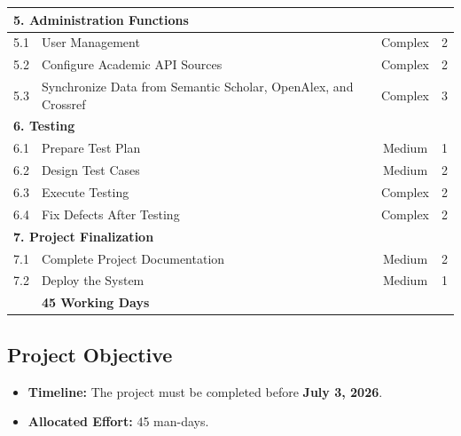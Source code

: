 \documentclass[12pt,a4paper]{article}
\begin{document}
\begin{longtable}{|c|p{9cm}|c|c|}
		\multicolumn{4}{|l|}{\textbf{5. Administration Functions}}\\
		\hline
		5.1 & User Management & \cellcolor{Complex} Complex & 2\\
		\hline
		5.2 & Configure Academic API Sources & \cellcolor{Complex} Complex & 2\\
		\hline
		5.3 & Synchronize Data from Semantic Scholar, OpenAlex, and Crossref & \cellcolor{Complex} Complex & 3\\
		\hline
		
		\multicolumn{4}{|l|}{\textbf{6. Testing}}\\
		\hline
		6.1 & Prepare Test Plan & \cellcolor{Medium} Medium & 1\\
		\hline
		6.2 & Design Test Cases & \cellcolor{Medium} Medium & 2\\
		\hline
		6.3 & Execute Testing & \cellcolor{Complex} Complex & 2\\
		\hline
		6.4 & Fix Defects After Testing & \cellcolor{Complex} Complex & 2\\
		\hline
		
		\multicolumn{4}{|l|}{\textbf{7. Project Finalization}}\\
		\hline
		7.1 & Complete Project Documentation & \cellcolor{Medium} Medium & 2\\
		\hline
		7.2 & Deploy the System & \cellcolor{Medium} Medium & 1\\
	
		
		\rowcolor{HeaderGray}
		\multicolumn{3}{|r|}{\textbf{Total Duration}} & \textbf{45 Working Days}\\
		\hline
		
	\end{longtable}
	\subsection{Project Objective}
	
	\begin{itemize}
		\item \textbf{Timeline:} The project must be completed before \textbf{July 3, 2026}.
		\item \textbf{Allocated Effort:} 45 man-days.
	\end{itemize}
\end{document}
